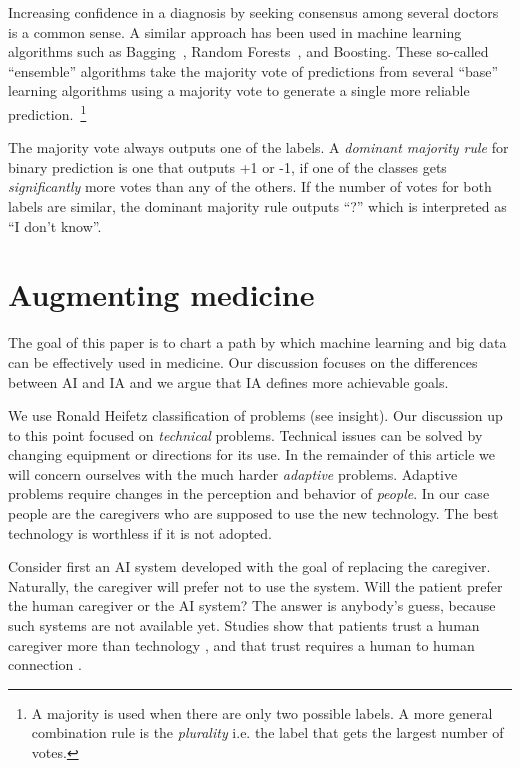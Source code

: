 \documentclass[11pt]{pnas-new}
\begin{document}
Increasing confidence in a diagnosis by seeking consensus among
several doctors is a common sense. A similar approach has been used in
machine learning algorithms such as Bagging~\cite{breiman1996bagging},
Random Forests~\cite{breiman2001random}, and
Boosting\cite{SchapireFr2012}. These so-called ``ensemble'' algorithms
take the majority vote of predictions from several ``base'' learning
algorithms using a majority vote to generate a single more reliable
prediction.~\footnote{A majority is used when there are only two
  possible labels. A more general combination rule is the {\em
    plurality} i.e. the label that gets the largest number of votes.}

The majority vote always outputs one of the labels. A {\em dominant
  majority rule} for binary prediction is one that outputs +1 or -1,
if one of the classes gets {\em significantly} more votes than any of
the others. If the number of votes for both labels are similar, the
dominant majority rule outputs ``?'' which is interpreted as ``I don't
know''.

\section{Augmenting medicine}


The goal of this paper is to chart a path by which machine learning
and big data can be effectively used in medicine. Our discussion
focuses on the differences between AI and IA and we argue that IA
defines more achievable goals.

We use Ronald Heifetz classification of problems (see insight). Our
discussion up to this point focused on {\em technical}
problems. Technical issues can be solved by changing equipment or
directions for its use. In the remainder of this article we will
concern ourselves with the much harder {\em adaptive}
problems. Adaptive problems require changes in the perception and
behavior of {\em people}. In our case people are the caregivers who
are supposed to use the new technology. The best technology is
worthless if it is not adopted.

Consider first an AI system developed with the goal of replacing the
caregiver. Naturally, the caregiver will prefer not to use the
system. Will the patient prefer the human caregiver or the AI system?
The answer is anybody's guess, because such systems are not available
yet. Studies show that patients trust a human caregiver more than
technology \cite{ongena2020patients}, and that trust requires a human
to human connection \cite{nundy2019promoting}.
\end{document}
